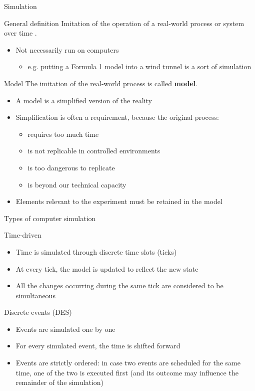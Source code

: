 \documentclass[presentation]{beamer}
\begin{document}
\begin{frame}{Simulation}
	\begin{block}{General definition}
		Imitation of the operation of a real-world process or system over time \cite{des-book}.
		\begin{itemize}
			\item Not necessarily run on computers
			\begin{itemize}
				\item e.g. putting a Formula 1 model into a wind tunnel is a sort of simulation
			\end{itemize}
		\end{itemize}
	\end{block}
	\begin{block}{Model}
		The imitation of the real-world process is called \textbf{model}.
		\begin{itemize}
			\item A model is a simplified version of the reality
			\item Simplification is often a requirement, because the original process:
			\begin{itemize}
				\item requires too much time
				\item is not replicable in controlled environments
				\item is too dangerous to replicate
				\item is beyond our technical capacity
			\end{itemize}
			\item Elements relevant to the experiment must be retained in the model
		\end{itemize}
	\end{block}
\end{frame}

\begin{frame}{Types of computer simulation}
	\begin{block}{Time-driven}
		\begin{itemize}
			\item Time is simulated through discrete time slots (ticks)
			\item At every tick, the model is updated to reflect the new state
			\item All the changes occurring during the same tick are considered to be simultaneous
		\end{itemize}
	\end{block}
	\begin{block}{Discrete events (DES)}
		\begin{itemize}
			\item Events are simulated one by one
			\item For every simulated event, the time is shifted forward
			\item Events are strictly ordered: in case two events are scheduled for the same time, one of the two is executed first (and its outcome may influence the remainder of the simulation)
		\end{itemize}
	\end{block}
\end{frame}
\end{document}
